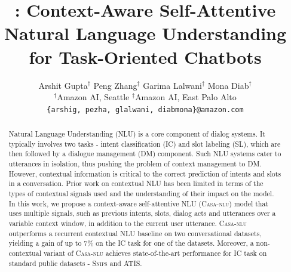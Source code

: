 \documentclass[11pt,a4paper]{article}
\title{\pretty{Casa-nlu}: Context-Aware Self-Attentive Natural Language Understanding for Task-Oriented Chatbots}
\author{Arshit Gupta$^\dagger$  
  \quad Peng Zhang$^\ddagger$ \quad Garima Lalwani$^\ddagger$ \quad Mona Diab$^\dagger$\\
$^\dagger$Amazon AI, Seattle \quad $^\ddagger$Amazon AI, East Palo Alto\\
{\tt \{arshig, pezha, glalwani, diabmona\}@amazon.com}}
\date{}
\newcommand{\pretty}[1]{\textsc{#1}}
\begin{document}
\maketitle
\begin{abstract}
Natural Language Understanding (NLU) is a core component of dialog systems. It typically involves two tasks - intent classification (IC) and slot labeling (SL), which are then followed by a dialogue management (DM) component. 
Such NLU systems cater to
utterances in isolation, thus pushing the problem of context management to DM. 
However, contextual information is critical to the correct prediction of intents and slots in a conversation. 
Prior work on contextual NLU has been limited in terms of the types of contextual signals used and the understanding of their impact on the model. 
In this work, we propose a context-aware self-attentive NLU (\pretty{Casa-nlu}) model that uses multiple signals, such as previous intents, slots, dialog acts and utterances over a variable context window, in addition to the current user utterance. \pretty{Casa-nlu} outperforms a recurrent contextual NLU baseline on two conversational datasets, yielding a gain of up to 7\% on the IC task for one of the datasets. Moreover, a non-contextual variant of \pretty{Casa-nlu} achieves state-of-the-art performance for IC task on standard public datasets -  \pretty{Snips} and \pretty{ATIS}.
\end{abstract}






%









%






%
\clearpage
\newpage
%
\begin{appendices}

\end{appendices}
\end{document}
